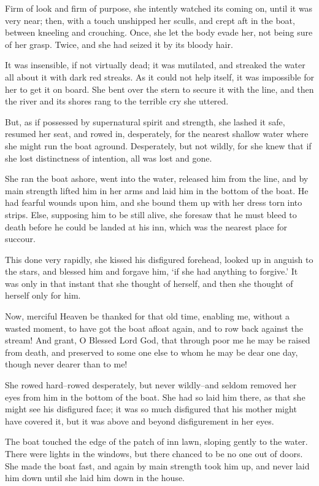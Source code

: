 Firm of look and firm of purpose, she intently watched its coming on,
until it was very near; then, with a touch unshipped her sculls, and
crept aft in the boat, between kneeling and crouching. Once, she let the
body evade her, not being sure of her grasp. Twice, and she had seized
it by its bloody hair.

It was insensible, if not virtually dead; it was mutilated, and streaked
the water all about it with dark red streaks. As it could not help
itself, it was impossible for her to get it on board. She bent over the
stern to secure it with the line, and then the river and its shores rang
to the terrible cry she uttered.

But, as if possessed by supernatural spirit and strength, she lashed
it safe, resumed her seat, and rowed in, desperately, for the nearest
shallow water where she might run the boat aground. Desperately, but not
wildly, for she knew that if she lost distinctness of intention, all was
lost and gone.

She ran the boat ashore, went into the water, released him from the
line, and by main strength lifted him in her arms and laid him in the
bottom of the boat. He had fearful wounds upon him, and she bound them
up with her dress torn into strips. Else, supposing him to be still
alive, she foresaw that he must bleed to death before he could be landed
at his inn, which was the nearest place for succour.

This done very rapidly, she kissed his disfigured forehead, looked up
in anguish to the stars, and blessed him and forgave him, ‘if she had
anything to forgive.’ It was only in that instant that she thought of
herself, and then she thought of herself only for him.

Now, merciful Heaven be thanked for that old time, enabling me, without
a wasted moment, to have got the boat afloat again, and to row back
against the stream! And grant, O Blessed Lord God, that through poor me
he may be raised from death, and preserved to some one else to whom he
may be dear one day, though never dearer than to me!

She rowed hard--rowed desperately, but never wildly--and seldom removed
her eyes from him in the bottom of the boat. She had so laid him there,
as that she might see his disfigured face; it was so much disfigured
that his mother might have covered it, but it was above and beyond
disfigurement in her eyes.

The boat touched the edge of the patch of inn lawn, sloping gently to
the water. There were lights in the windows, but there chanced to be
no one out of doors. She made the boat fast, and again by main strength
took him up, and never laid him down until she laid him down in the
house.

